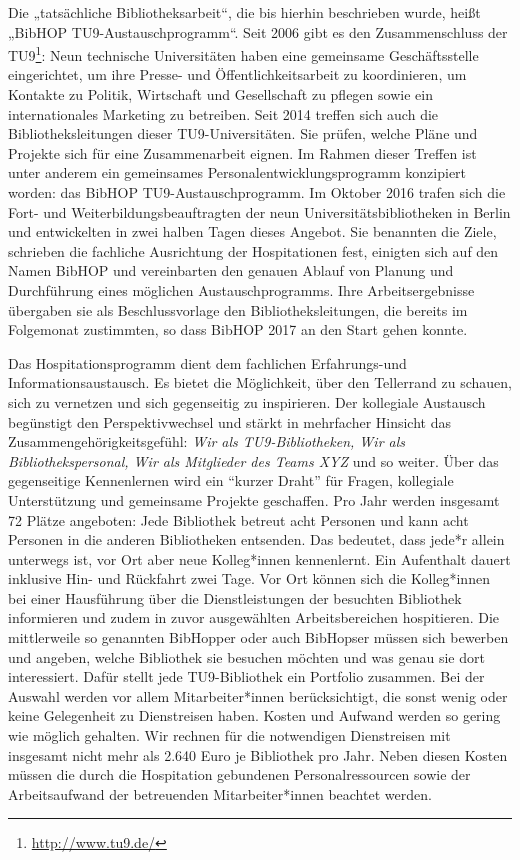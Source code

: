 \documentclass[a4paper,
fontsize=11pt,
oneside,
numbers=noperiodatend,
parskip=half-,
bibliography=totoc,
final
]{scrartcl}
\begin{document}
Die „tatsächliche Bibliotheksarbeit``, die bis hierhin beschrieben
wurde, heißt „BibHOP TU9-Austauschprogramm``. Seit 2006 gibt es den
Zusammenschluss der TU9\footnote{\href{http://www.tu9.de/}{http://www.tu9.de/}}:
Neun technische Universitäten haben eine gemeinsame Geschäftsstelle
eingerichtet, um ihre Presse- und Öffentlichkeitsarbeit zu koordinieren,
um Kontakte zu Politik, Wirtschaft und Gesellschaft zu pflegen sowie ein
internationales Marketing zu betreiben. Seit 2014 treffen sich auch die
Bibliotheksleitungen dieser TU9-Universitäten. Sie prüfen, welche Pläne
und Projekte sich für eine Zusammenarbeit eignen. Im Rahmen dieser
Treffen ist unter anderem ein gemeinsames Personalentwicklungsprogramm
konzipiert worden: das BibHOP TU9-Austauschprogramm. Im Oktober 2016
trafen sich die Fort- und Weiterbildungsbeauftragten der neun
Universitätsbibliotheken in Berlin und entwickelten in zwei halben Tagen
dieses Angebot. Sie benannten die Ziele, schrieben die fachliche
Ausrichtung der Hospitationen fest, einigten sich auf den Namen BibHOP
und vereinbarten den genauen Ablauf von Planung und Durchführung eines
möglichen Austauschprogramms. Ihre Arbeitsergebnisse übergaben sie als
Beschlussvorlage den Bibliotheksleitungen, die bereits im Folgemonat
zustimmten, so dass BibHOP 2017 an den Start gehen konnte.

Das Hospitationsprogramm dient dem fachlichen Erfahrungs-und
Informationsaustausch. Es bietet die Möglichkeit, über den Tellerrand zu
schauen, sich zu vernetzen und sich gegenseitig zu inspirieren. Der
kollegiale Austausch begünstigt den Perspektivwechsel und stärkt in
mehrfacher Hinsicht das Zusammengehörigkeitsgefühl: \emph{Wir als
TU9-Bibliotheken, Wir als Bibliothekspersonal, Wir als Mitglieder des
Teams XYZ} und so weiter. Über das gegenseitige Kennenlernen wird ein
\enquote{kurzer Draht} für Fragen, kollegiale Unterstützung und
gemeinsame Projekte geschaffen. Pro Jahr werden insgesamt 72 Plätze
angeboten: Jede Bibliothek betreut acht Personen und kann acht Personen
in die anderen Bibliotheken entsenden. Das bedeutet, dass jede*r allein
unterwegs ist, vor Ort aber neue Kolleg*innen kennenlernt. Ein
Aufenthalt dauert inklusive Hin- und Rückfahrt zwei Tage. Vor Ort können
sich die Kolleg*innen bei einer Hausführung über die Dienstleistungen
der besuchten Bibliothek informieren und zudem in zuvor ausgewählten
Arbeitsbereichen hospitieren. Die mittlerweile so genannten BibHopper
oder auch BibHopser müssen sich bewerben und angeben, welche Bibliothek
sie besuchen möchten und was genau sie dort interessiert. Dafür stellt
jede TU9-Bibliothek ein Portfolio zusammen. Bei der Auswahl werden vor
allem Mitarbeiter*innen berücksichtigt, die sonst wenig oder keine
Gelegenheit zu Dienstreisen haben. Kosten und Aufwand werden so gering
wie möglich gehalten. Wir rechnen für die notwendigen Dienstreisen mit
insgesamt nicht mehr als 2.640 Euro je Bibliothek pro Jahr. Neben diesen
Kosten müssen die durch die Hospitation gebundenen Personalressourcen
sowie der Arbeitsaufwand der betreuenden Mitarbeiter*innen beachtet
werden.
\end{document}
